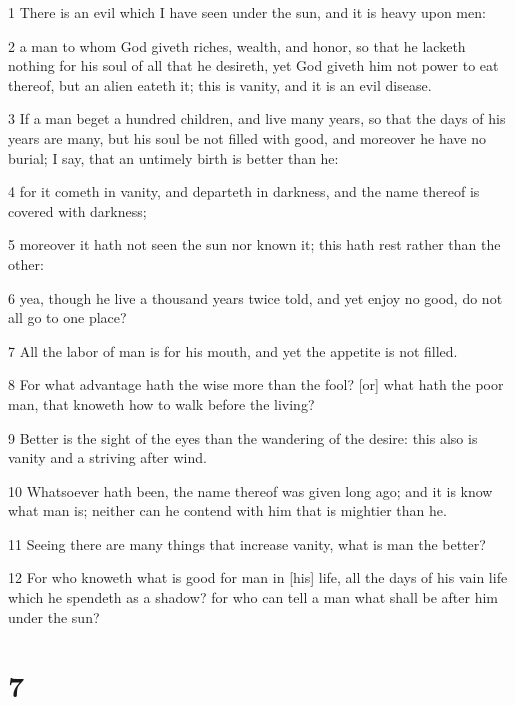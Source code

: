 \par 1 There is an evil which I have seen under the sun, and it is heavy upon men:
\par 2 a man to whom God giveth riches, wealth, and honor, so that he lacketh nothing for his soul of all that he desireth, yet God giveth him not power to eat thereof, but an alien eateth it; this is vanity, and it is an evil disease.
\par 3 If a man beget a hundred children, and live many years, so that the days of his years are many, but his soul be not filled with good, and moreover he have no burial; I say, that an untimely birth is better than he:
\par 4 for it cometh in vanity, and departeth in darkness, and the name thereof is covered with darkness;
\par 5 moreover it hath not seen the sun nor known it; this hath rest rather than the other:
\par 6 yea, though he live a thousand years twice told, and yet enjoy no good, do not all go to one place?
\par 7 All the labor of man is for his mouth, and yet the appetite is not filled.
\par 8 For what advantage hath the wise more than the fool? [or] what hath the poor man, that knoweth how to walk before the living?
\par 9 Better is the sight of the eyes than the wandering of the desire: this also is vanity and a striving after wind.
\par 10 Whatsoever hath been, the name thereof was given long ago; and it is know what man is; neither can he contend with him that is mightier than he.
\par 11 Seeing there are many things that increase vanity, what is man the better?
\par 12 For who knoweth what is good for man in [his] life, all the days of his vain life which he spendeth as a shadow? for who can tell a man what shall be after him under the sun?

\chapter{7}

